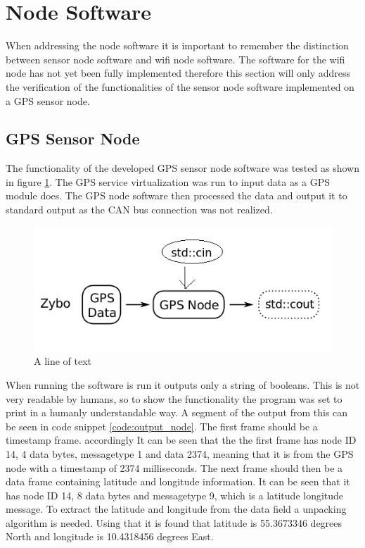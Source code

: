 \section{Node Software}
\label{sec:node_software}
When addressing the node software it is important to remember the distinction between sensor node software and wifi node software.
The software for the wifi node has not yet been fully implemented therefore this section will only address the verification of the functionalities of the sensor node software implemented on a GPS sensor node.

\subsection{GPS Sensor Node}
The functionality of the developed GPS sensor node software was tested as shown in figure \ref{fig:sensor_gps_veri}.
The GPS service virtualization was run to input data as a GPS module does. 
The GPS node software then processed the data and output it to standard output as the CAN bus connection was not realized.

\begin{figure}[h]
	\centering
	\includegraphics[width = 0.6\linewidth]{graphics/sensor_gps_veri}
	\caption{A line of text}
	\label{fig:sensor_gps_veri}
\end{figure}

When running the software is run it outputs only a string of booleans. 
This is not very readable by humans, so to show the functionality the program was set to print in a humanly understandable way.
A segment of the output from this can be seen in code snippet \ref{code:output_node}.
The first frame should be a timestamp frame. accordingly
It can be seen that the the first frame has node ID 14, 4 data bytes, messagetype 1 and data 2374, meaning that it is from the GPS node with a timestamp of 2374 milliseconds.
The next frame should then be a data frame containing latitude and longitude information.
It can be seen that it has node ID 14, 8 data bytes and messagetype 9, which is a latitude longitude message.
To extract the latitude and longitude from the data field a unpacking algorithm is needed.
Using that it is found that latitude is 55.3673346 degrees North and longitude is 10.4318456 degrees East.

